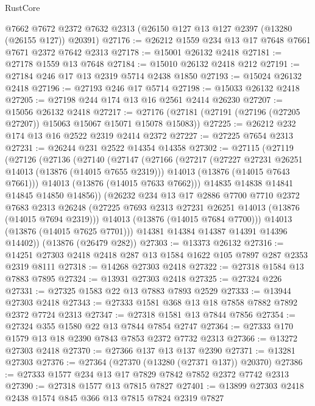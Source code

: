 \begin{lexlean}{RustCore}
\begin{coremodule}
    @7662
    @7672
    @2372
    @7632
    @2313
    (@26150 @127 @13 @127 @2397 (@13280 (@26155 @127)) @20391)
@27176 := @26212 @1559 @234 @13 @17 @7648 @7661 @7671 @2372 @7642 @2313
@27178 := @15001 @26132 @2418
@27181 := @27178 @1559 @13 @7648
@27184 := @15010 @26132 @2418 @212
@27191 := @27184 @246 @17 @13 @2319 @5714 @2438 @1850
@27193 := @15024 @26132 @2418
@27196 := @27193 @246 @17 @5714
@27198 := @15033 @26132 @2418
@27205 := @27198 @244 @174 @13 @16 @2561 @2414 @26230
@27207 := @15056 @26132 @2418
@27217 := @27176 (@27181 (@27191 (@27196 (@27205 @27207)) @15063 @15067 @15071 @15078 @15083))
@27225 := @26212 @232 @174 @13 @16 @2522 @2319 @2414 @2372
@27227 := @27225 @7654 @2313
@27231 := @26244 @231 @2522 @14354 @14358
@27302 := @27115
    (@27119
      (@27126
        (@27136
          (@27140
            (@27147
              (@27166
                (@27217
                  (@27227 @27231 @26251 @14013 (@13876 (@14015 @7655 @2319)))
                  @14013
                  (@13876 (@14015 @7643 @7661)))
                @14013
                (@13876 (@14015 @7633 @7662)))
              @14835
              @14838
              @14841
              @14845
              @14850
              @14856))
          (@26232
            @234
            @13
            @17
            @2886
            @7700
            @7710
            @2372
            @7683
            @2313
            @26248
            (@27225 @7693 @2313 @27231 @26251 @14013 (@13876 (@14015 @7694 @2319)))
            @14013
            (@13876 (@14015 @7684 @7700)))
          @14013
          (@13876 (@14015 @7625 @7701)))
        @14381
        @14384
        @14387
        @14391
        @14396
        @14402))
    (@13876 (@26479 @282))
@27303 := @13373 @26132
@27316 := @14251 @27303 @2418 @2418 @287 @13 @1584 @1622 @105 @7897 @287 @2353 @2319 @8111
@27318 := @14268 @27303 @2418
@27322 := @27318 @1584 @13 @7883 @7895
@27324 := @13931 @27303 @2418
@27325 := @27324 @226
@27331 := @27325 @1583 @22 @13 @7883 @7893 @2529
@27333 := @13944 @27303 @2418
@27343 := @27333 @1581 @368 @13 @18 @7858 @7882 @7892 @2372 @7724 @2313
@27347 := @27318 @1581 @13 @7844 @7856
@27354 := @27324 @355 @1580 @22 @13 @7844 @7854 @2747
@27364 := @27333 @170 @1579 @13 @18 @2390 @7843 @7853 @2372 @7732 @2313
@27366 := @13272 @27303 @2418
@27370 := @27366 @137 @13 @137 @2390
@27371 := @13281 @27303
@27376 := @27364 (@27370 (@13280 (@27371 @137)) @20370)
@27386 := @27333 @1577 @234 @13 @17 @7829 @7842 @7852 @2372 @7742 @2313
@27390 := @27318 @1577 @13 @7815 @7827
@27401 := @13899 @27303 @2418 @2438 @1574 @845 @366 @13 @7815 @7824 @2319 @7827

\end{coremodule}
\end{lexlean}
